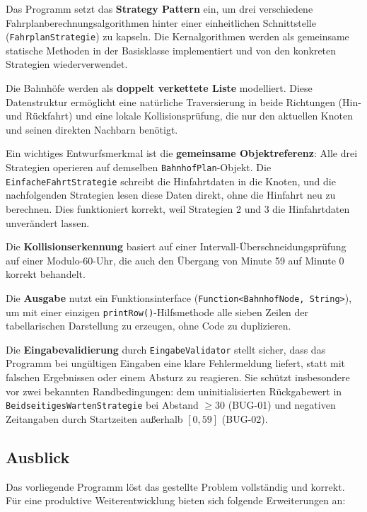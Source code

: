 \documentclass[12pt,a4paper]{article}
\begin{document}
Das Programm setzt das \textbf{Strategy Pattern} ein, um drei verschiedene Fahrplanberechnungsalgorithmen hinter einer einheitlichen Schnittstelle (\texttt{FahrplanStrategie}) zu kapseln. Die Kernalgorithmen werden als gemeinsame statische Methoden in der Basisklasse implementiert und von den konkreten Strategien wiederverwendet.

Die Bahnhöfe werden als \textbf{doppelt verkettete Liste} modelliert. Diese Datenstruktur ermöglicht eine natürliche Traversierung in beide Richtungen (Hin- und Rückfahrt) und eine lokale Kollisionsprüfung, die nur den aktuellen Knoten und seinen direkten Nachbarn benötigt.

Ein wichtiges Entwurfsmerkmal ist die \textbf{gemeinsame Objektreferenz}: Alle drei Strategien operieren auf demselben \texttt{BahnhofPlan}-Objekt. Die \texttt{EinfacheFahrtStrategie} schreibt die Hinfahrtdaten in die Knoten, und die nachfolgenden Strategien lesen diese Daten direkt, ohne die Hinfahrt neu zu berechnen. Dies funktioniert korrekt, weil Strategien 2 und 3 die Hinfahrtdaten unverändert lassen.

Die \textbf{Kollisionserkennung} basiert auf einer Intervall-Überschneidungsprüfung auf einer Modulo-60-Uhr, die auch den Übergang von Minute 59 auf Minute 0 korrekt behandelt.

Die \textbf{Ausgabe} nutzt ein Funktionsinterface (\texttt{Function<BahnhofNode, String>}), um mit einer einzigen \texttt{printRow()}-Hilfsmethode alle sieben Zeilen der tabellarischen Darstellung zu erzeugen, ohne Code zu duplizieren.

Die \textbf{Eingabevalidierung} durch \texttt{EingabeValidator} stellt sicher, dass das Programm bei ungültigen Eingaben eine klare Fehlermeldung liefert, statt mit falschen Ergebnissen oder einem Absturz zu reagieren. Sie schützt insbesondere vor zwei bekannten Randbedingungen: dem uninitialisierten Rückgabewert in \texttt{BeidseitigesWartenStrategie} bei Abstand $\geq 30$ (BUG-01) und negativen Zeitangaben durch Startzeiten außerhalb $[0,59]$ (BUG-02).

\subsection{Ausblick}

Das vorliegende Programm löst das gestellte Problem vollständig und korrekt.
Für eine produktive Weiterentwicklung bieten sich folgende Erweiterungen an:
\end{document}
